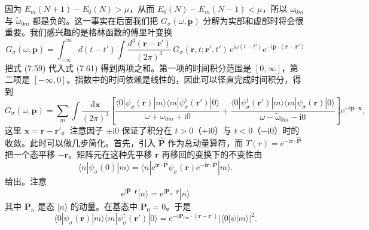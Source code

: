因为 $E_{m}(N+1)-E_{0}(N)>\mu$，从而 $E_{0}(N)-E_{m}(N-1)<\mu$，所以 $\omega_{0m}$ 与 $\tilde{\omega}_{0m}$ 都是负的。这一事实在后面我们把 $G_{\sigma}(\omega,\mathbf{p})$ 分解为实部和虚部时将会很重要。我们感兴趣的是格林函数的傅里叶变换
\begin{equation*}
G_{\sigma}(\omega,\mathbf{p})=\int_{-\infty}^{\infty}d(t-t')\int\frac{d^{3}(\mathbf{r}-\mathbf{r}')}{(2\pi)^{3}}\,G_{\sigma}(\mathbf{r},t;\mathbf{r}',t')\,\mathrm{e}^{\mathrm{i}\omega(t-t')}\mathrm{e}^{-\mathrm{i}\mathbf{p}\cdot(\mathbf{r}-\mathbf{r}')}\tag{7.61}
\end{equation*}
把式 (7.59) 代入式 (7.61) 得到两项之和。第一项的时间积分范围是 $[0,\infty]$，第二项是 $[-\infty,0]$。指数中的时间依赖是线性的，因此可以径直完成时间积分，得到
\begin{equation*}
G_{\sigma}(\omega,\mathbf{p})=\sum_{m}\int\frac{\mathrm{d}\mathbf{x}}{(2\pi)^{3}}\left[\frac{\langle 0|\psi_{\sigma}(\mathbf{r})|m\rangle\langle m|\psi_{\sigma}^{\dagger}(\mathbf{r}')|0\rangle}{\omega+\omega_{0m}+\mathrm{i}0}+\frac{\langle 0|\psi_{\sigma}^{\dagger}(\mathbf{r}')|m\rangle\langle m|\psi_{\sigma}(\mathbf{r})|0\rangle}{\omega-\tilde{\omega}_{0m}-\mathrm{i}0}\right]\mathrm{e}^{-\mathrm{i}\mathbf{p}\cdot\mathbf{x}},\tag{7.62}
\end{equation*}
这里 $\mathbf{x}=\mathbf{r}-\mathbf{r}'$。注意因子 $\pm\mathrm{i}0$ 保证了积分在 $t>0$（$+\mathrm{i}0$）与 $t<0$（$-\mathrm{i}0$）时的收敛。此时可以做几步简化。首先，引入 $\hat{\mathbf{P}}$ 作为总动量算符，而 $T(r)=\mathrm{e}^{-\mathrm{i}\mathbf{r}\cdot\hat{\mathbf{P}}}$ 把一个态平移 $-\mathbf{r}$。矩阵元在这种先平移 $\mathbf{r}$ 再移回的变换下的不变性由
\begin{equation*}
\langle n|\psi_{\sigma}(0)|m\rangle=\langle n|\mathrm{e}^{\mathrm{i}\mathbf{r}\cdot\hat{\mathbf{P}}}\psi_{\sigma}(\mathbf{r})\mathrm{e}^{-\mathrm{i}\mathbf{r}\cdot\hat{\mathbf{P}}}|m\rangle.\tag{7.63}
\end{equation*}
给出。注意
\begin{equation*}
\mathrm{e}^{\mathrm{i}\hat{\mathbf{P}}\cdot\mathbf{r}}|n\rangle=\mathrm{e}^{\mathrm{i}\mathbf{P}_{n}\cdot\mathbf{r}}|n\rangle\tag{7.64}
\end{equation*}
其中 $\mathbf{P}_{n}$ 是态 $|n\rangle$ 的动量。在基态中 $\mathbf{P}_{0}=0$。于是
\begin{equation*}
\langle 0|\psi_{\sigma}(\mathbf{r})|m\rangle\langle m|\psi_{\sigma}^{\dagger}(\mathbf{r}')|0\rangle=\mathrm{e}^{-\mathrm{i}\mathbf{P}_{0m}\cdot(\mathbf{r}-\mathbf{r}')}|\langle 0|\psi|m\rangle|^{2}.\tag{7.65}
\end{equation*}

